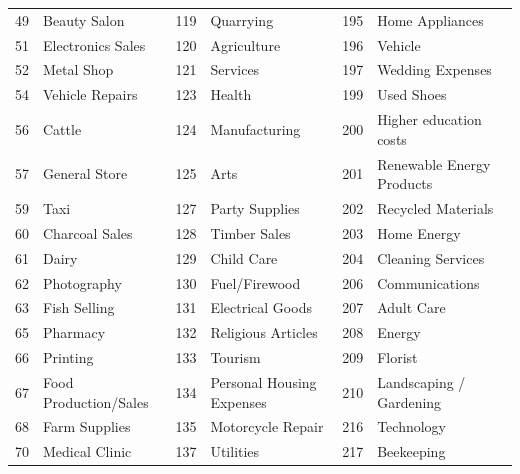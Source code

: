 \begin{longtable}[]{|r|l|r|l|r|l|}
	49          & Beauty Salon          & 119         & Quarrying                 & 195         & Home Appliances            \\
	51          & Electronics Sales     & 120         & Agriculture               & 196         & Vehicle                    \\
	52          & Metal Shop            & 121         & Services                  & 197         & Wedding Expenses           \\
	54          & Vehicle Repairs       & 123         & Health                    & 199         & Used Shoes                 \\
	56          & Cattle                & 124         & Manufacturing             & 200         & Higher education costs     \\
	57          & General Store         & 125         & Arts                      & 201         & Renewable Energy Products  \\
	59          & Taxi                  & 127         & Party Supplies            & 202         & Recycled Materials         \\
	60          & Charcoal Sales        & 128         & Timber Sales              & 203         & Home Energy                \\
	61          & Dairy                 & 129         & Child Care                & 204         & Cleaning Services          \\
	62          & Photography           & 130         & Fuel/Firewood             & 206         & Communications             \\
	63          & Fish Selling          & 131         & Electrical Goods          & 207         & Adult Care                 \\
	65          & Pharmacy              & 132         & Religious Articles        & 208         & Energy                     \\
	66          & Printing              & 133         & Tourism                   & 209         & Florist                    \\
	67          & Food Production/Sales & 134         & Personal Housing Expenses & 210         &
	Landscaping / Gardening                                                                                                  \\
	68          & Farm Supplies         & 135         & Motorcycle Repair         & 216         & Technology                 \\
	70          & Medical Clinic        & 137         & Utilities                 & 217         & Beekeeping                 \\

\end{longtable}
